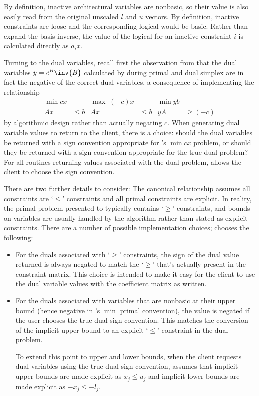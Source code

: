 By definition, inactive architectural variables are nonbasic, so their value is
also easily read from the original unscaled $l$ and $u$ vectors.
By definition, inactive constraints are loose and the corresponding logical
would be basic.
Rather than expand the basis inverse,
the value of the logical for an inactive constraint $i$ is calculated
directly as $a_i x$.

Turning to the dual variables, recall first the observation from
 that the dual variables $y = c^B \inv{B}$ calculated by
\dylp during primal and dual simplex are in fact the negative of the correct
dual variables, a consequence of implementing the relationship
\begin{align*}
\min cx & & \max \; (-c)x & & \min yb & \\
Ax & \leq b & Ax & \leq b &  yA & \geq (-c)
\end{align*}
by algorithmic design rather than actually negating $c$.
When generating dual variable values to return to the client, there is a
choice: should the dual variables be returned with a sign convention
appropriate for \dylp's $\min cx$ problem, or should they be returned with a
sign convention appropriate for the true dual problem?
For all routines returning values associated with the dual problem, \dylp
allows the client to choose the sign convention.

There are two further details to consider: The canonical relationship assumes
all constraints are `$\leq$' constraints and
all primal constraints are explicit.
In reality, the primal problem presented to \dylp typically contains `$\geq$'
constraints, and bounds on variables are usually handled by the algorithm
rather than stated as explicit constraints.
There are a number of possible implementation choices; \dylp chooses the
following:
\begin{itemize}
  \item
  For the duals associated with `$\geq$' constraints, the sign of the dual
  value returned is always negated to match the `$\geq$' that's actually
  present in the constraint matrix.
  This choice is intended to make it easy for the client to use the dual
  variable values with the coefficient matrix as written.

  \item
  For the duals associated with variables that are nonbasic at their upper
  bound (hence negative in \dylp's $\min$ primal convention), the value is
  negated if the user chooses the true dual sign convention.
  This matches the conversion of the implicit upper bound to an explicit
  `$\leq$' constraint in the dual problem.

  To extend this point to upper and lower bounds, when the client requests
  dual variables using the true dual sign convention, \dylp assumes that
  implicit upper bounds are made explicit as $x_j \leq u_j$ and implicit
  lower bounds are made explicit as $-x_j \leq -l_j$.
\end{itemize}



